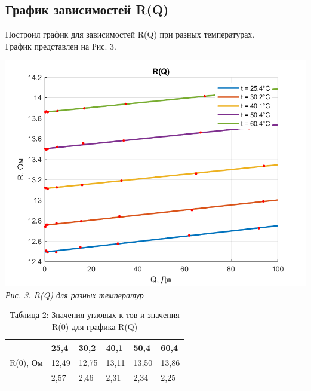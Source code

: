 

\subsection{График зависимостей R(Q)}

Построил график для зависимостей R(Q) при разных температурах. \\График представлен на Рис. 3. \\

\begin{center}
    \includegraphics[scale = 1.3]{picks/223_R(Q).png} \\
    \textit{\textcolor[HTML]{000000}{Рис. 3. R(Q) для разных температур}}
\end{center}

\vspace{0.5cm}

    \begin{table}[h!]
    	\begin{center}
    		\caption*{\color[HTML]{000000}Таблица 2: Значения угловых к-тов и значения R(0) для графика R(Q)}
    		\begin{tabular}{|P{3cm}|P{1.3cm}|P{1.3cm}|P{1.3cm}|P{1.3cm}|P{1.3cm}|}
    		\hline

                    		& 25,4  & 30,2  & 40,1  & 50,4  & 60,4 \\  
    		    \hline
    		    R(0), Ом                    & 12,49 & 12,75 & 13,11 & 13,50 & 13,86 \\
    		    \hline
                  & 2,57 & 2,46 & 2,31 & 2,34 & 2,25 \\


            \hline    		
    		\end{tabular}
    	\end{center}
    \end{table}

